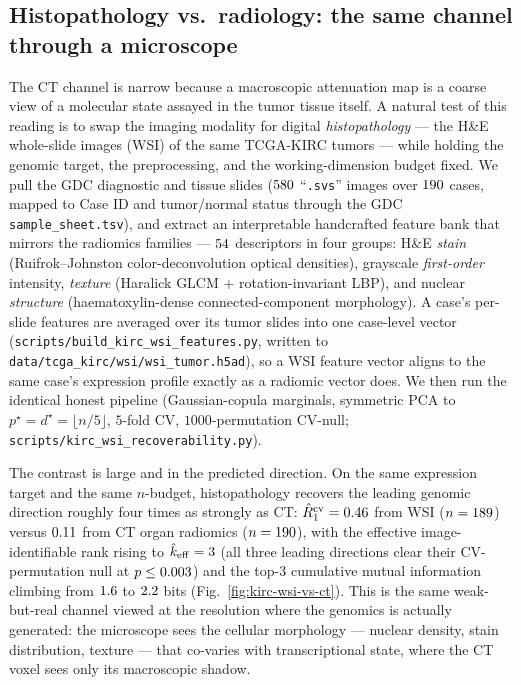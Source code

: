 \documentclass{article}
\begin{document}
\subsection{Histopathology vs.\ radiology: the same channel through a microscope}
\label{sec:kirc-wsi}
The CT channel is narrow because a macroscopic attenuation map is a coarse view
of a molecular state assayed in the tumor tissue itself. A natural test of this
reading is to swap the imaging modality for digital \emph{histopathology} --- the
H\&E whole-slide images (WSI) of the same TCGA-KIRC tumors --- while holding the
genomic target, the preprocessing, and the working-dimension budget fixed. We
pull the GDC diagnostic and tissue slides ($580$ ``\texttt{.svs}'' images
over $190$ cases, mapped to Case ID and tumor/normal status through the
GDC \texttt{sample\_sheet.tsv}), and extract an interpretable handcrafted feature
bank that mirrors the radiomics families --- $54$ descriptors in four
groups: H\&E \emph{stain} (Ruifrok--Johnston color-deconvolution optical
densities), grayscale \emph{first-order} intensity, \emph{texture}
(Haralick GLCM + rotation-invariant LBP), and nuclear \emph{structure}
(haematoxylin-dense connected-component morphology). A case's per-slide features
are averaged over its tumor slides into one case-level vector
(\texttt{scripts/build\_kirc\_wsi\_features.py}, written to
\texttt{data/tcga\_kirc/wsi/wsi\_tumor.h5ad}), so a WSI feature vector aligns to
the same case's expression profile exactly as a radiomic vector does. We then run
the identical honest pipeline (Gaussian-copula marginals, symmetric PCA to
$p^\star = d^\star = \lfloor n/5\rfloor$, $5$-fold CV, $1000$-permutation
CV-null; \texttt{scripts/kirc\_wsi\_recoverability.py}).

The contrast is large and in the predicted direction. On the same expression
target and the same $n$-budget, histopathology recovers the leading genomic
direction roughly four times as strongly as CT:
$\hat R_1^{\mathrm{cv}} = 0.46$ from WSI ($n=189$) versus
$0.11$ from CT organ radiomics ($n=190$), with the effective
image-identifiable rank rising to $\hat k_{\mathrm{eff}} = 3$
(all three leading directions clear their CV-permutation null at $p \le
0.003$) and the top-$3$ cumulative mutual information climbing from
$1.6$ to $2.2$ bits (Fig.~\ref{fig:kirc-wsi-vs-ct}). This is the same
weak-but-real channel viewed at the resolution where the genomics is actually
generated: the microscope sees the cellular morphology --- nuclear density,
stain distribution, texture --- that co-varies with transcriptional state, where
the CT voxel sees only its macroscopic shadow.
\end{document}
